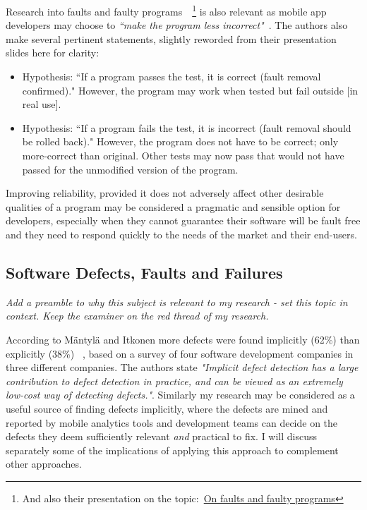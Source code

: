 Research into faults and faulty programs~\cite{mili2014_on_faults_and_faulty_programs}~\footnote{And also their presentation on the topic:~\href{http://mathcs.chapman.edu/ramics2014/slides/MiliFriasJaouaRAMiCS2014.pdf}{On faults and faulty programs}} is also relevant as mobile app developers may choose to \emph{``make the program less incorrect"}~\cite{mili2014_on_faults_and_faulty_programs}. The authors also make several pertinent statements, slightly reworded from their presentation slides here for clarity:
\begin{itemize}
    \item Hypothesis: ``If a program passes the test, it is correct (fault removal confirmed)." However, the program may work when tested but fail outside [in real use].
    \item Hypothesis: ``If a program fails the test, it is incorrect (fault removal should be rolled back)." However, the program does not have to be correct; only more-correct than original. Other tests may now pass that would not have passed for the unmodified version of the program.
\end{itemize}

Improving reliability, provided it does not adversely affect other desirable qualities of a program may be considered a pragmatic and sensible option for developers, especially when they cannot guarantee their software will be fault free and they need to respond quickly to the needs of the market and their end-users.



\hypertarget{defects.faults.failures}{}
\subsection{Software Defects, Faults and Failures}
\emph{Add a preamble to why this subject is relevant to my research - set this topic in context. Keep the examiner on the red thread of my research.}


According to Mäntylä and Itkonen more defects were found implicitly (62\%) than explicitly (38\%) ~\cite{mantyla2014_how_are_software_defects_found}, based on a survey of four software development companies in three different companies. The authors state \emph{"Implicit defect detection has a large contribution to defect detection in practice, and can be viewed as
an extremely low-cost way of detecting defects."}. Similarly my research may be considered as a useful source of finding defects implicitly, where the defects are mined and reported by mobile analytics tools and development teams can decide on the defects they deem sufficiently relevant \emph{and} practical to fix. I will discuss separately some of the implications of applying this approach to complement other approaches.

